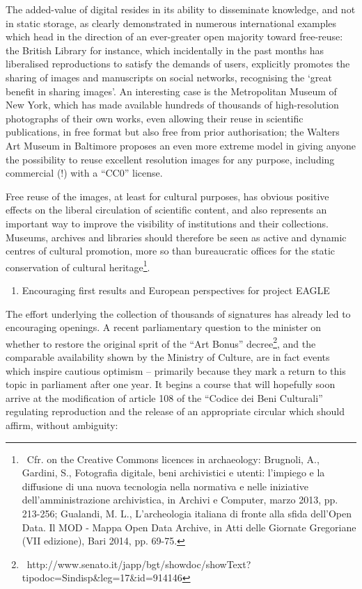 \documentclass[amsthm,ebook]{saparticle}
\begin{document}
The added-value of digital resides in its ability to disseminate knowledge, and not in static storage, as clearly
demonstrated in numerous international examples which head in the direction of an ever-greater open majority toward
free-reuse: the British Library for instance, which incidentally in the past months has liberalised reproductions to
satisfy the demands of users, explicitly promotes the sharing of images and manuscripts on social networks, recognising
the ‘great benefit in sharing images’. An interesting case is the Metropolitan Museum of New York, which has made
available hundreds of thousands of high-resolution photographs of their own works, even allowing their reuse in
scientific publications, in free format but also free from prior authorisation; the Walters Art Museum in Baltimore
proposes an even more extreme model in giving anyone the possibility to reuse excellent resolution images for any
purpose, including commercial (!) with a “CC0” license.

Free reuse of the images, at least for cultural purposes, has obvious positive effects on the liberal circulation of
scientific content, and also represents an important way to improve the visibility of institutions and their
collections. Museums, archives and libraries should therefore be seen as active and dynamic centres of cultural
promotion, more so than bureaucratic offices for the static conservation of cultural heritage\footnote{\ Cfr. on the
Creative Commons licences in archaeology: Brugnoli, A., Gardini, S., Fotografia digitale, beni archivistici e utenti:
l’impiego e la diffusione di una nuova tecnologia nella normativa e nelle iniziative dell’amministrazione archivistica,
in Archivi e Computer, marzo 2013, pp. 213-256; Gualandi, M. L., L’archeologia italiana di fronte alla sfida dell'Open
Data. Il MOD - Mappa Open Data Archive, in Atti delle Giornate Gregoriane (VII edizione), Bari 2014, pp. 69-75.}.




\begin{enumerate}
\item Encouraging first results and European perspectives for project EAGLE
\end{enumerate}
The effort underlying the collection of thousands of signatures has already led to encouraging openings. A recent
parliamentary question to the minister on whether to restore the original sprit of the “Art Bonus”
decree\footnote{\ http://www.senato.it/japp/bgt/showdoc/showText?tipodoc=Sindisp\&leg=17\&id=914146}, and the
comparable availability shown by the Ministry of Culture, are in fact events which inspire cautious optimism –
primarily because they mark a return to this topic in parliament after one year. It begins a course that will hopefully
soon arrive at the modification of article 108 of the “Codice dei Beni Culturali” regulating reproduction and the
release of an appropriate circular which should affirm, without ambiguity:
\end{document}
